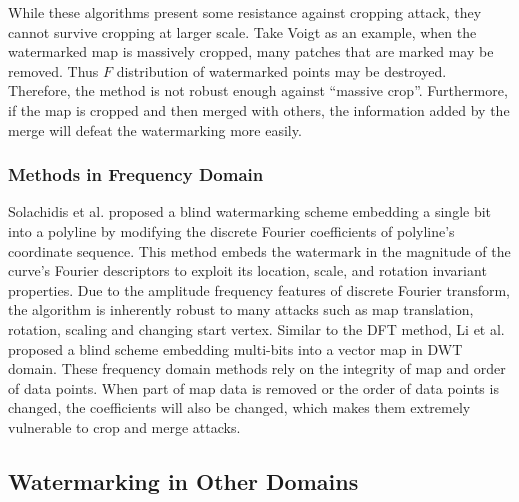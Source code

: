While these algorithms present some resistance against cropping attack, 
they cannot survive cropping at larger scale.
Take Voigt\cite{Voigt:2003} as an example, when the watermarked map is 
massively cropped, many patches that are marked may be
removed. Thus $F$ distribution of watermarked points may be destroyed. 
Therefore, the method is not robust enough against ``massive crop''. 
Furthermore, if the map is cropped and then merged with others, 
the information added by the merge will defeat the watermarking more easily.

\subsubsection{Methods in Frequency Domain}
 
Solachidis et al.\cite{DFT} proposed a blind watermarking scheme embedding 
a single bit into a polyline by modifying the discrete Fourier coefficients 
of polyline's coordinate sequence.  This method embeds the watermark in 
the magnitude of the curve's Fourier descriptors to exploit 
its location, scale, and rotation invariant properties. Due to the amplitude frequency 
features of discrete Fourier transform, the algorithm is inherently robust to many attacks 
such as map translation, rotation, scaling and changing start vertex. Similar to the DFT 
method\cite{DFT}, Li et al. proposed a blind scheme \cite{Liyuanyuan03} embedding 
multi-bits into a vector map in DWT domain. 
These frequency domain methods rely on the integrity
of map and order of data points. When part of map data is removed or the order 
of data points is changed, the coefficients will 
also be changed, which makes them extremely vulnerable to crop 
and merge attacks.


\subsection{Watermarking in Other Domains}

